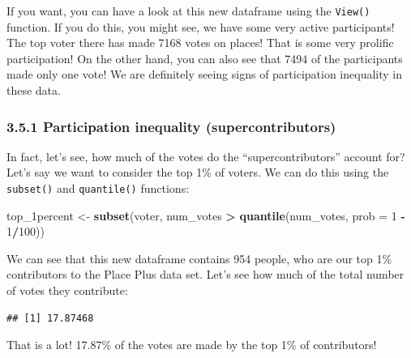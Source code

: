 \documentclass[
]{article}
\newenvironment{Shaded}{\begin{snugshade}}{\end{snugshade}}
\newcommand{\DataTypeTok}[1]{\textcolor[rgb]{0.13,0.29,0.53}{#1}}
\newcommand{\DecValTok}[1]{\textcolor[rgb]{0.00,0.00,0.81}{#1}}
\newcommand{\KeywordTok}[1]{\textcolor[rgb]{0.13,0.29,0.53}{\textbf{#1}}}
\newcommand{\NormalTok}[1]{#1}
\newcommand{\OperatorTok}[1]{\textcolor[rgb]{0.81,0.36,0.00}{\textbf{#1}}}
\newcommand{\StringTok}[1]{\textcolor[rgb]{0.31,0.60,0.02}{#1}}
\begin{document}
If you want, you can have a look at this new dataframe using the
\texttt{View()} function. If you do this, you might see, we have some
very active participants! The top voter there has made 7168 votes on
places! That is some very prolific participation! On the other hand, you
can also see that 7494 of the participants made only one vote! We are
definitely seeing signs of participation inequality in these data.

\hypertarget{participation-inequality-supercontributors}{%
\subsubsection{3.5.1 Participation inequality
(supercontributors)}\label{participation-inequality-supercontributors}}

In fact, let's see, how much of the votes do the ``supercontributors''
account for? Let's say we want to consider the top 1\% of voters. We can
do this using the \texttt{subset()} and \texttt{quantile()} functions:

\begin{Shaded}
\begin{Highlighting}[]
\NormalTok{top_1percent <-}\StringTok{ }\KeywordTok{subset}\NormalTok{(voter, num_votes }\OperatorTok{>}\StringTok{ }\KeywordTok{quantile}\NormalTok{(num_votes, }\DataTypeTok{prob =} \DecValTok{1} \OperatorTok{-}\StringTok{ }\DecValTok{1}\OperatorTok{/}\DecValTok{100}\NormalTok{)) }
\end{Highlighting}
\end{Shaded}

We can see that this new dataframe contains 954 people, who are our top
1\% contributors to the Place Plus data set. Let's see how much of the
total number of votes they contribute:

\begin{Shaded}
\end{Shaded}

\begin{verbatim}
## [1] 17.87468
\end{verbatim}

That is a lot! 17.87\% of the votes are made by the top 1\% of
contributors!
\end{document}
